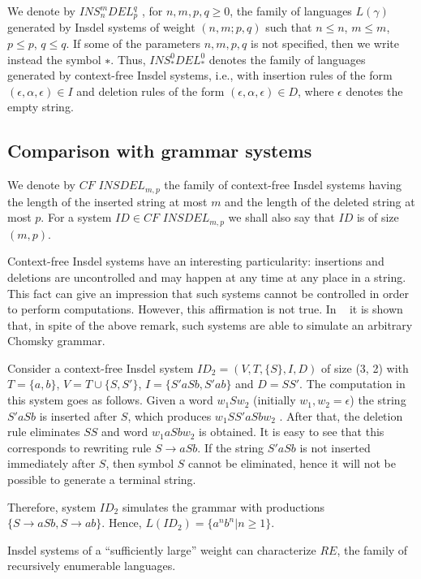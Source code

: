 We denote by $INS_n^mDEL_p^q$ , for $n, m, p, q \geq 0$, the family of languages $L(\gamma)$
generated by Insdel systems of weight $(n , m ; p , q )$ such that $n \leq n$, $m \leq m$,
$p \leq p$, $q \leq q$. If some of the parameters $n, m, p, q$ is not specified, then we write
instead the symbol $∗$. Thus, $INS_*^0DEL_*^0$ denotes the family of languages generated
by context-free Insdel systems, i.e., with insertion rules of the form $(\epsilon, \alpha, \epsilon) \in I$ and
deletion rules of the form $(\epsilon, \alpha, \epsilon) \in D$, where $\epsilon$ denotes the empty string. 

\subsection{Comparison with grammar systems}
We denote by $CF$ $INSDEL_{m,p}$ the family of context-free Insdel systems
having the length of the inserted string at most $m$ and the length of the deleted string
at most $p$. For a system $ID\in CF$ $INSDEL_{m,p}$ we shall also say that $ID$ is of size
$(m, p)$.

Context-free Insdel systems have an interesting particularity: insertions and deletions 
are uncontrolled and may happen at any time at any place in a string. This fact
can give an impression that such systems cannot be controlled in order to perform
computations. However, this affirmation is not true. In ~\cite{margentern} it is shown that, in spite of
the above remark, such systems are able to simulate an arbitrary Chomsky grammar.

\begin{example}
Consider a context-free Insdel system $ID_2 = (V, T, \{S\}, I, D)$
of size (3, 2) with $T = \{a, b\}$, $V = T \cup \{S, S'\}$, $I = \{S'aSb, S'ab\}$ and $D = SS'$.
The computation in this system goes as follows. Given a word $w_1 Sw_2$ (initially
$w_1 , w_2 = \epsilon$) the string $S'aSb$ is inserted after $S$, which produces $w_1SS'aSbw_2$ . After
that, the deletion rule eliminates $SS$ and word $w_1aSbw_2$ is obtained. It is easy
to see that this corresponds to rewriting rule $S \rightarrow aSb$. If the string $S'aSb$ is not
inserted immediately after $S$, then symbol $S$ cannot be eliminated, hence it will not
be possible to generate a terminal string.

Therefore, system $ID_2$ simulates the grammar with productions $\{S \rightarrow aSb, S \rightarrow
ab\}$. Hence, $L(ID_2 ) = \{a^nb^n | n \geq 1\}$.
\end{example}
Insdel systems of a “sufficiently large” weight can characterize $RE$, the family
of recursively enumerable languages. 

